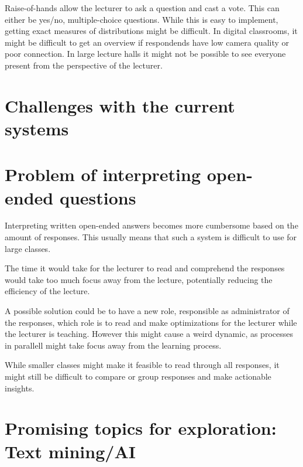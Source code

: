 Raise-of-hands allow the lecturer to ask a question and cast a vote. This can either be yes/no, multiple-choice questions. While this is easy to implement, getting exact measures of distributions might be difficult. In digital classrooms, it might be difficult to get an overview if respondends have low camera quality or poor connection. In large lecture halls it might not be possible to see everyone present from the perspective of the lecturer. 

\section{Challenges with the current systems}

\section{Problem of interpreting open-ended questions}
Interpreting written open-ended answers becomes more cumbersome based on the amount of responses. This usually means that such a system is difficult to use for large classes. 

The time it would take for the lecturer to read and comprehend the responses would take too much focus away from the lecture, potentially reducing the efficiency of the lecture. 

A possible solution could be to have a new role, responsible as administrator of the responses, which role is to read and make optimizations for the lecturer while the lecturer is teaching. However this might cause a weird dynamic, as processes in parallell might take focus away from the learning process.

While smaller classes might make it feasible to read through all responses, it might still be difficult to compare or group responses and make actionable insights. 

\section{Promising topics for exploration: Text mining/AI}


